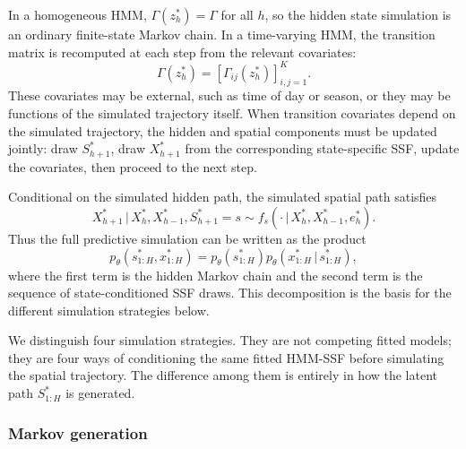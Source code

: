 \documentclass[11pt]{article}
\newcommand{\given}{\,\vert\,}
\begin{document}
In a homogeneous HMM, $\Gamma(z_h^{\ast})=\Gamma$ for all $h$, so the hidden
state simulation is an ordinary finite-state Markov chain. In a time-varying
HMM, the transition matrix is recomputed at each step from the relevant
covariates:
\[
  \Gamma(z_h^{\ast})
  =
  \left[
    \Gamma_{ij}(z_h^{\ast})
  \right]_{i,j=1}^{K}.
\]
These covariates may be external, such as time of day or season, or they may be
functions of the simulated trajectory itself. When transition covariates depend
on the simulated trajectory, the hidden and spatial components must be updated
jointly: draw $S_{h+1}^{\ast}$, draw $X_{h+1}^{\ast}$ from the corresponding
state-specific SSF, update the covariates, then proceed to the next step.

Conditional on the simulated hidden path, the simulated spatial path satisfies
\begin{equation*}
  X_{h+1}^{\ast}
  \given X_{h}^{\ast}, X_{h-1}^{\ast}, S_{h+1}^{\ast}=s
  \sim
  f_s(\cdot \given X_h^{\ast}, X_{h-1}^{\ast}, e_h^{\ast}).
\end{equation*}
Thus the full predictive simulation can be written as the product
\begin{equation*}
  p_{\theta}(s_{1:H}^{\ast},x_{1:H}^{\ast})
  =
  p_{\theta}(s_{1:H}^{\ast})
  p_{\theta}(x_{1:H}^{\ast}\given s_{1:H}^{\ast}),
\end{equation*}
where the first term is the hidden Markov chain and the second term is the
sequence of state-conditioned SSF draws. This decomposition is the basis for
the different simulation strategies below.

We distinguish four simulation strategies. They are not competing fitted
models; they are four ways of conditioning the same fitted HMM-SSF before
simulating the spatial trajectory. The difference among them is entirely in
how the latent path $S_{1:H}^{\ast}$ is generated.

\subsubsection*{Markov generation}
\end{document}
